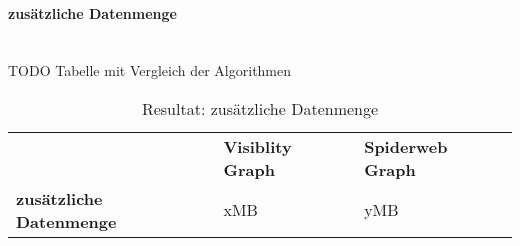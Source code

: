 \paragraph{zusätzliche Datenmenge}\label{result:zusätzliche Datenmenge}~\\
TODO Tabelle mit Vergleich der Algorithmen
\begin{table}[ht]
    \centering
    \caption{Resultat: zusätzliche Datenmenge}
    \label{Resultat: zusätzliche Datenmenge}
    \begin{tabular}{lll}
        & \textbf{Visiblity Graph} & \textbf{Spiderweb Graph} \\
        \textbf{zusätzliche Datenmenge} & xMB                    & yMB                   
    \end{tabular}
\end{table}

